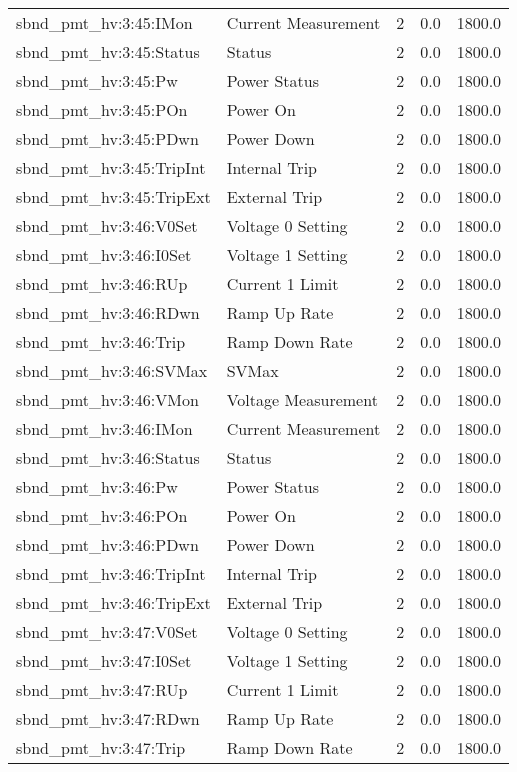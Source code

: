 \begin{center}
\begin{longtable}{l | l l l l }
sbnd\_pmt\_hv:3:45:IMon & Current Measurement & 2 & 0.0 & 1800.0\\ 
sbnd\_pmt\_hv:3:45:Status & Status & 2 & 0.0 & 1800.0\\ 
sbnd\_pmt\_hv:3:45:Pw & Power Status & 2 & 0.0 & 1800.0\\ 
sbnd\_pmt\_hv:3:45:POn & Power On & 2 & 0.0 & 1800.0\\ 
sbnd\_pmt\_hv:3:45:PDwn & Power Down & 2 & 0.0 & 1800.0\\ 
sbnd\_pmt\_hv:3:45:TripInt & Internal Trip & 2 & 0.0 & 1800.0\\ 
sbnd\_pmt\_hv:3:45:TripExt & External Trip & 2 & 0.0 & 1800.0\\ 
sbnd\_pmt\_hv:3:46:V0Set & Voltage 0 Setting & 2 & 0.0 & 1800.0\\ 
sbnd\_pmt\_hv:3:46:I0Set & Voltage 1 Setting & 2 & 0.0 & 1800.0\\ 
sbnd\_pmt\_hv:3:46:RUp & Current 1 Limit & 2 & 0.0 & 1800.0\\ 
sbnd\_pmt\_hv:3:46:RDwn & Ramp Up Rate & 2 & 0.0 & 1800.0\\ 
sbnd\_pmt\_hv:3:46:Trip & Ramp Down Rate & 2 & 0.0 & 1800.0\\ 
sbnd\_pmt\_hv:3:46:SVMax & SVMax & 2 & 0.0 & 1800.0\\ 
sbnd\_pmt\_hv:3:46:VMon & Voltage Measurement & 2 & 0.0 & 1800.0\\ 
sbnd\_pmt\_hv:3:46:IMon & Current Measurement & 2 & 0.0 & 1800.0\\ 
sbnd\_pmt\_hv:3:46:Status & Status & 2 & 0.0 & 1800.0\\ 
sbnd\_pmt\_hv:3:46:Pw & Power Status & 2 & 0.0 & 1800.0\\ 
sbnd\_pmt\_hv:3:46:POn & Power On & 2 & 0.0 & 1800.0\\ 
sbnd\_pmt\_hv:3:46:PDwn & Power Down & 2 & 0.0 & 1800.0\\ 
sbnd\_pmt\_hv:3:46:TripInt & Internal Trip & 2 & 0.0 & 1800.0\\ 
sbnd\_pmt\_hv:3:46:TripExt & External Trip & 2 & 0.0 & 1800.0\\ 
sbnd\_pmt\_hv:3:47:V0Set & Voltage 0 Setting & 2 & 0.0 & 1800.0\\ 
sbnd\_pmt\_hv:3:47:I0Set & Voltage 1 Setting & 2 & 0.0 & 1800.0\\ 
sbnd\_pmt\_hv:3:47:RUp & Current 1 Limit & 2 & 0.0 & 1800.0\\ 
sbnd\_pmt\_hv:3:47:RDwn & Ramp Up Rate & 2 & 0.0 & 1800.0\\ 
sbnd\_pmt\_hv:3:47:Trip & Ramp Down Rate & 2 & 0.0 & 1800.0\\ 

\end{longtable}
\end{center}
